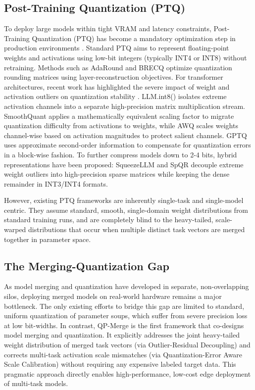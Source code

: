 \subsection{Post-Training Quantization (PTQ)}
To deploy large models within tight VRAM and latency constraints, Post-Training Quantization (PTQ) has become a mandatory optimization step in production environments \cite{han2015deep,nagel2020up}. Standard PTQ aims to represent floating-point weights and activations using low-bit integers (typically INT4 or INT8) without retraining. Methods such as AdaRound \cite{nagel2020up} and BRECQ \cite{brecq2021nagel} optimize quantization rounding matrices using layer-reconstruction objectives. For transformer architectures, recent work has highlighted the severe impact of weight and activation outliers on quantization stability \cite{dettmers2022gpt3}. LLM.int8() \cite{dettmers2022gpt3} isolates extreme activation channels into a separate high-precision matrix multiplication stream. SmoothQuant \cite{xiao2023smoothquant} applies a mathematically equivalent scaling factor to migrate quantization difficulty from activations to weights, while AWQ \cite{lin2023awq} scales weights channel-wise based on activation magnitudes to protect salient channels. GPTQ \cite{frantar2022gptq} uses approximate second-order information to compensate for quantization errors in a block-wise fashion. To further compress models down to 2-4 bits, hybrid representations have been proposed: SqueezeLLM \cite{squeezellm2023} and SpQR \cite{spqr2023} decouple extreme weight outliers into high-precision sparse matrices while keeping the dense remainder in INT3/INT4 formats. 

However, existing PTQ frameworks are inherently single-task and single-model centric. They assume standard, smooth, single-domain weight distributions from standard training runs, and are completely blind to the heavy-tailed, scale-warped distributions that occur when multiple distinct task vectors are merged together in parameter space.

\subsection{The Merging-Quantization Gap}
As model merging and quantization have developed in separate, non-overlapping silos, deploying merged models on real-world hardware remains a major bottleneck. The only existing efforts to bridge this gap are limited to standard, uniform quantization of parameter soups, which suffer from severe precision loss at low bit-widths. In contrast, QP-Merge is the first framework that co-designs model merging and quantization. It explicitly addresses the joint heavy-tailed weight distribution of merged task vectors (via Outlier-Residual Decoupling) and corrects multi-task activation scale mismatches (via Quantization-Error Aware Scale Calibration) without requiring any expensive labeled target data. This pragmatic approach directly enables high-performance, low-cost edge deployment of multi-task models.
